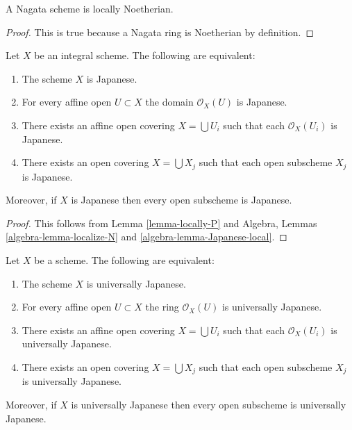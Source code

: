 \begin{lemma}
\label{lemma-nagata-locally-Noetherian}
A Nagata scheme is locally Noetherian.
\end{lemma}

\begin{proof}
This is true because a Nagata ring is Noetherian by definition.
\end{proof}

\begin{lemma}
\label{lemma-locally-Japanese}
Let $X$ be an integral scheme. The following are equivalent:
\begin{enumerate}
\item The scheme $X$ is Japanese.
\item For every affine open $U \subset X$ the domain $\mathcal{O}_X(U)$
is Japanese.
\item There exists an affine open covering $X = \bigcup U_i$
such that each $\mathcal{O}_X(U_i)$ is Japanese.
\item There exists an open covering $X = \bigcup X_j$
such that each open subscheme $X_j$ is Japanese.
\end{enumerate}
Moreover, if $X$ is Japanese then every open subscheme
is Japanese.
\end{lemma}

\begin{proof}
This follows from Lemma \ref{lemma-locally-P} and
Algebra, Lemmas \ref{algebra-lemma-localize-N} and
\ref{algebra-lemma-Japanese-local}.
\end{proof}

\begin{lemma}
\label{lemma-locally-universally-Japanese}
Let $X$ be a scheme. The following are equivalent:
\begin{enumerate}
\item The scheme $X$ is universally Japanese.
\item For every affine open $U \subset X$ the ring $\mathcal{O}_X(U)$
is universally Japanese.
\item There exists an affine open covering $X = \bigcup U_i$
such that each $\mathcal{O}_X(U_i)$ is universally Japanese.
\item There exists an open covering $X = \bigcup X_j$
such that each open subscheme $X_j$ is universally Japanese.
\end{enumerate}
Moreover, if $X$ is universally Japanese then every open subscheme
is universally Japanese.
\end{lemma}


